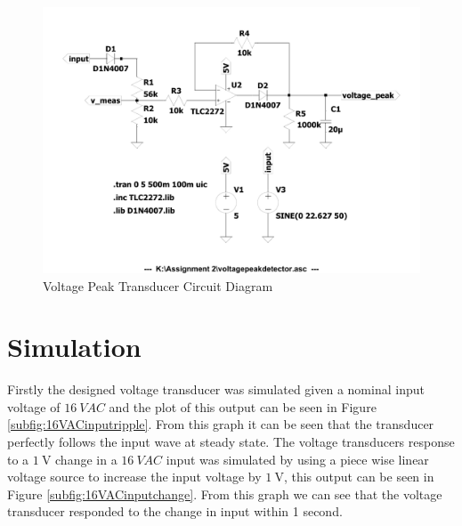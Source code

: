\begin{figure}[h!]
    \centering
    \includegraphics[width = 0.65\linewidth]{Figures/voltagepeakdetector.pdf}
        \caption{Voltage Peak Transducer Circuit Diagram}
    \label{fig:voltagepeakdetector.pdf}
\end{figure}


\section{Simulation} \label{sec:simulation_voltage_peak_transducer}
Firstly the designed voltage transducer was simulated given a nominal input voltage of $\SI{16}{VAC}$ and the plot of this output can be seen in Figure \ref{subfig:16VACinputripple}. From this graph it can be seen that the transducer perfectly follows the input wave at steady state. The voltage transducers response to a $\SI{1}{\volt}$ change in a $\SI{16}{VAC}$ input was simulated by using a piece wise linear voltage source to increase the input voltage by $\SI{1}{\volt}$, this output can be seen in Figure \ref{subfig:16VACinputchange}. From this graph we can see that the voltage transducer responded to the change in input within 1 second.

